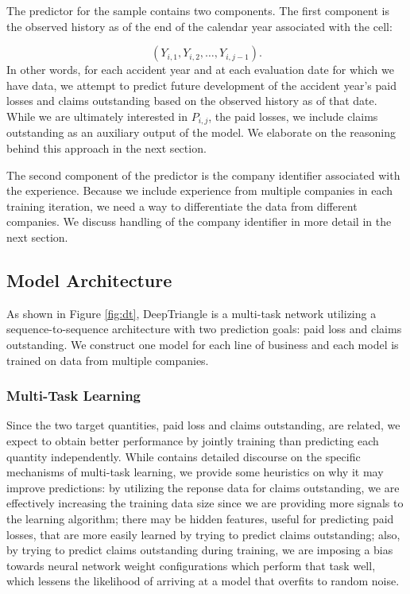 \documentclass[risks,article,submit,moreauthors,pdftex]{mdpi}
\begin{document}
The predictor for the sample contains two components. The first component is the observed history as of the end of the calendar year associated with the cell:

\begin{equation}
(Y_{i,1}, Y_{i,2}, \dots, Y_{i,j-1}).
\end{equation}
In other words, for each accident year and at each evaluation date for which we have data, we attempt to predict future development of the accident year's paid losses and claims outstanding based on the observed history as of that date. While we are ultimately interested in \(P_{i,j}\), the paid losses, we include claims outstanding as an auxiliary output of the model. We elaborate on the reasoning behind this approach in the next section.

The second component of the predictor is the company identifier associated with the experience. Because we include experience from multiple companies in each training iteration, we need a way to differentiate the data from different companies. We discuss handling of the company identifier in more detail in the next section.

\hypertarget{model-architecture}{%
\subsection{Model Architecture}\label{model-architecture}}

As shown in Figure \ref{fig:dt}, DeepTriangle is a multi-task network \citep{caruana1997multitask} utilizing a sequence-to-sequence architecture \citep{sutskever2014sequence, DBLP:journals/corr/SrivastavaMS15} with two prediction goals: paid loss and claims outstanding. We construct one model for each line of business and each model is trained on data from multiple companies.

\hypertarget{multi-task-learning}{%
\subsubsection{Multi-Task Learning}\label{multi-task-learning}}

Since the two target quantities, paid loss and claims outstanding, are related, we expect to obtain better performance by jointly training than predicting each quantity independently. While \citet{caruana1997multitask} contains detailed discourse on the specific mechanisms of multi-task learning, we provide some heuristics on why it may improve predictions: by utilizing the reponse data for claims outstanding, we are effectively increasing the training data size since we are providing more signals to the learning algorithm; there may be hidden features, useful for predicting paid losses, that are more easily learned by trying to predict claims outstanding; also, by trying to predict claims outstanding during training, we are imposing a bias towards neural network weight configurations which perform that task well, which lessens the likelihood of arriving at a model that overfits to random noise.
\end{document}
